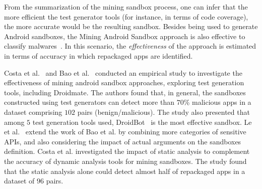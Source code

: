 From the summarization of the mining sandbox process, one can infer that the more efficient the test generator
tools (for instance, in terms of code coverage), the more accurate would be the resulting
sandbox. Besides being used to generate Android sandboxes, the Mining Android Sandbox approach is also effective 
to classify malwares~\cite{DBLP:conf/wcre/BaoLL18}.  In this scenario, the \emph{effectiveness} of the approach
is estimated in terms of accuracy in which repackaged apps are identified.





Costa et al.~\cite{DBLP:conf/wcre/BaoLL18,DBLP:conf/scam/CostaMCMVBC20} and Bao et al.~\cite{DBLP:conf/wcre/BaoLL18} conducted an empirical study to investigate the effectiveness of mining android sandbox
approaches, exploring test generation tools, including Droidmate. The authors found that, in general, the sandboxes constructed using test generators can detect more than $70$\% malicious apps in a dataset comprising $102$ pairs (benign/malicious). The study also presented that among $5$ test generation tools used, DroidBot~\cite{DBLP:conf/icse/LiYGC17} is the most effective sandbox.
Le et al.~\cite{le2018towards} extend the work of Bao et al. by combining more categories of sensitive APIs, and also considering the impact of
actual arguments  on the sandboxes definition. Costa et al.\cite{DBLP:journals/jss/CostaMMSSBNR22} investigated the impact of static analysis to complement the accuracy of dynamic analysis tools for mining sandboxes. The study found that the static analysis alone could detect almost half of repackaged apps in a dataset of $96$ pairs.


